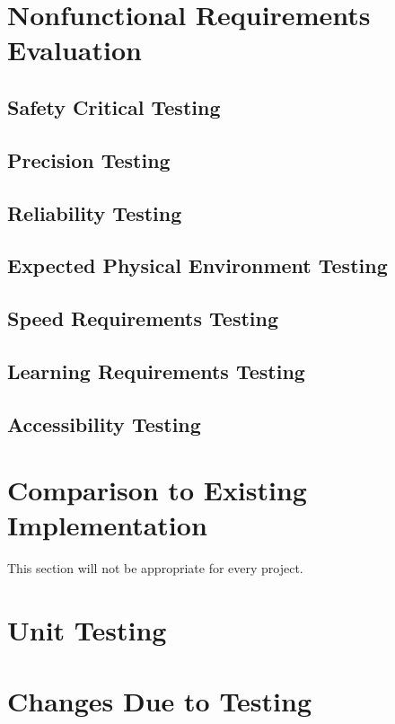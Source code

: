 \documentclass[12pt, titlepage]{article}
\begin{document}
\section{Nonfunctional Requirements Evaluation}

\subsection{Safety Critical Testing}
		
\subsection{Precision Testing}

\subsection{Reliability Testing}

\subsection{Expected Physical Environment Testing}

\subsection{Speed Requirements Testing}

\subsection{Learning Requirements Testing}

\subsection{Accessibility Testing}
	
\section{Comparison to Existing Implementation}	

This section will not be appropriate for every project.

\section{Unit Testing}

\section{Changes Due to Testing}
\end{document}
